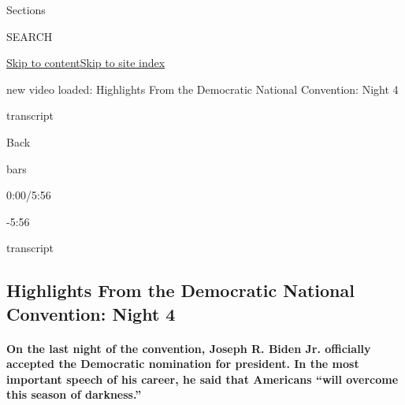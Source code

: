 Sections

SEARCH

\protect\hyperlink{site-content}{Skip to
content}\protect\hyperlink{site-index}{Skip to site index}

new video loaded: Highlights From the Democratic National Convention:
Night 4

transcript

Back

bars

0:00/5:56

-5:56

transcript

\hypertarget{highlights-from-the-democratic-national-convention-night-4}{%
\subsection{Highlights From the Democratic National Convention: Night
4}\label{highlights-from-the-democratic-national-convention-night-4}}

\hypertarget{on-the-last-night-of-the-convention-joseph-r-biden-jr-officially-accepted-the-democratic-nomination-for-president-in-the-most-important-speech-of-his-career-he-said-that-americans-will-overcome-this-season-of-darkness}{%
\paragraph{On the last night of the convention, Joseph R. Biden Jr.
officially accepted the Democratic nomination for president. In the most
important speech of his career, he said that Americans ``will overcome
this season of
darkness.''}\label{on-the-last-night-of-the-convention-joseph-r-biden-jr-officially-accepted-the-democratic-nomination-for-president-in-the-most-important-speech-of-his-career-he-said-that-americans-will-overcome-this-season-of-darkness}}

